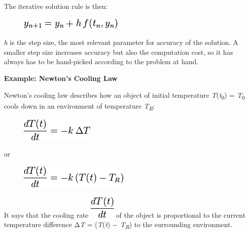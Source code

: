 The iterative solution rule is then:

\begin{figure}[H]
\centering
\includegraphics[scale=.6]{graphics/981cbbc69bfa735ea07313f59feba714.png}
\end{figure}

\emph{h} is the step size, the most relevant parameter for accuracy of
the solution. A smaller step size increases accuracy but also the
computation cost, so it has always has to be hand-picked according to
the problem at hand.

\textbf{Example: Newton's Cooling Law}

Newton's cooling law describes how an object of initial temperature
\emph{T}(\emph{t}\textsubscript{0}) = \emph{T}\textsubscript{0} cools
down in an environment of temperature \emph{T}\textsubscript{\emph{R}}:

\begin{figure}[H]
\centering
\includegraphics[scale=.6]{graphics/fca99b79cfa1b2d3a65395932e824f05.png}
\end{figure}

or

\begin{figure}[H]
\centering
\includegraphics[scale=.6]{graphics/5028ac33d1b22df1c9509179c615ce6a.png}
\end{figure}

It says that the cooling rate
\includegraphics[scale=.6]{graphics/54f43bb3bb190844c7989f5864df1b2a.png}
of the object is proportional to the current temperature difference
Δ\emph{T} = (\emph{T}(\emph{t}) − \emph{T}\textsubscript{\emph{R}}) to
the surrounding environment.

